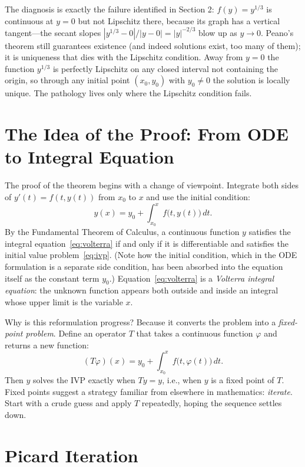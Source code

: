 \documentclass{essay}
\begin{document}
The diagnosis is exactly the failure identified in Section 2: $f(y) = y^{1/3}$ is continuous at $y = 0$ but not Lipschitz there, because its graph has a vertical tangent---the secant slopes $|y^{1/3} - 0|/|y - 0| = |y|^{-2/3}$ blow up as $y \to 0$. Peano's theorem still guarantees existence (and indeed solutions exist, too many of them); it is uniqueness that dies with the Lipschitz condition. Away from $y = 0$ the function $y^{1/3}$ is perfectly Lipschitz on any closed interval not containing the origin, so through any initial point $(x_0, y_0)$ with $y_0 \neq 0$ the solution is locally unique. The pathology lives only where the Lipschitz condition fails.

\section{The Idea of the Proof: From ODE to Integral Equation}

The proof of the theorem begins with a change of viewpoint. Integrate both sides of $y'(t) = f(t, y(t))$ from $x_0$ to $x$ and use the initial condition:
\begin{equation}
  y(x) = y_0 + \int_{x_0}^{x} f\bigl(t, y(t)\bigr)\, dt.
  \label{eq:volterra}
\end{equation}
By the Fundamental Theorem of Calculus, a continuous function $y$ satisfies the integral equation~\eqref{eq:volterra} if and only if it is differentiable and satisfies the initial value problem~\eqref{eq:ivp}. (Note how the initial condition, which in the ODE formulation is a separate side condition, has been absorbed into the equation itself as the constant term $y_0$.) Equation~\eqref{eq:volterra} is a \emph{Volterra integral equation}: the unknown function appears both outside and inside an integral whose upper limit is the variable $x$.

Why is this reformulation progress? Because it converts the problem into a \emph{fixed-point problem}. Define an operator $T$ that takes a continuous function $\varphi$ and returns a new function:
\[
  (T\varphi)(x) = y_0 + \int_{x_0}^{x} f\bigl(t, \varphi(t)\bigr)\, dt.
\]
Then $y$ solves the IVP exactly when $T y = y$, i.e., when $y$ is a fixed point of $T$. Fixed points suggest a strategy familiar from elsewhere in mathematics: \emph{iterate}. Start with a crude guess and apply $T$ repeatedly, hoping the sequence settles down.

\section{Picard Iteration}
\end{document}

